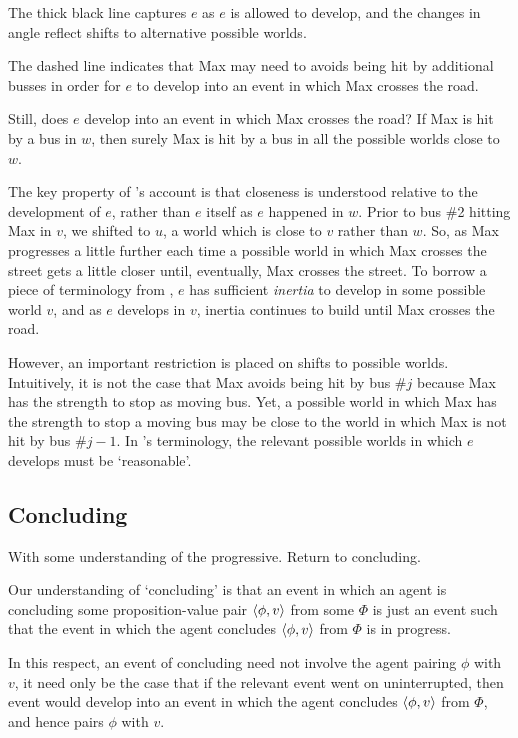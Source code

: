 \begin{note}
  The thick black line captures \(e\) as \(e\) is allowed to develop, and the changes in angle reflect shifts to alternative possible worlds.

  The dashed line indicates that Max may need to avoids being hit by additional busses in order for \(e\) to develop into an event in which Max crosses the road.

  Still, does \(e\) develop into an event in which Max crosses the road?
  If Max is hit by a bus in \(w\), then surely Max is hit by a bus in all the possible worlds close to \(w\).

  The key property of \citeauthor{Landman:1992wh}'s account is that closeness is understood relative to the development of \(e\), rather than \(e\) itself as \(e\) happened in \(w\).
  Prior to bus \#2 hitting Max in \(v\), we shifted to \(u\), a world which is close to \(v\) rather than \(w\).
  So, as Max progresses a little further each time a possible world in which Max crosses the street gets a little closer until, eventually, Max crosses the street.
  To borrow a piece of terminology from \textcite{Dowty:1979vq}, \(e\) has sufficient \emph{inertia} to develop in some possible world \(v\), and as \(e\) develops in \(v\), inertia continues to build until Max crosses the road.

  However, an important restriction is placed on shifts to possible worlds.
  Intuitively, it is not the case that Max avoids being hit by bus \#\(j\) because Max has the strength to stop as moving bus.
  Yet, a possible world in which Max has the strength to stop a moving bus may be close to the world in which Max is not hit by bus \#\(j - 1\).
  In \citeauthor{Landman:1992wh}'s terminology, the relevant possible worlds in which \(e\) develops must be `reasonable'.
\end{note}

\subsection{Concluding}

\begin{note}
  With some understanding of the progressive.
  Return to concluding.
\end{note}

\begin{note}
  Our understanding of `concluding' is that an event in which an agent is concluding some proposition-value pair \(\langle \phi, v \rangle\) from some \pool{} \(\Phi\) is just an event such that the event in which the agent concludes \(\langle \phi, v \rangle\) from \(\Phi\) is in progress.

  In this respect, an event of concluding need not involve the agent pairing \(\phi\) with \(v\), it need only be the case that if the relevant event went on uninterrupted, then event would develop into an event in which the agent concludes \(\langle \phi, v \rangle\) from \(\Phi\), and hence pairs \(\phi\) with \(v\).
\end{note}

